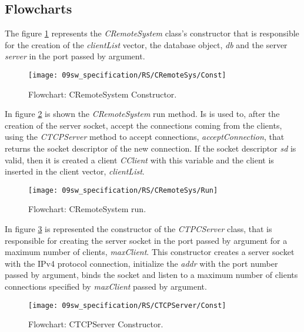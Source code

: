 \clearpage
\subsection{Flowcharts}

The figure \ref{fig:rsConst} represents the \textit{CRemoteSystem} class's constructor that is responsible for the creation of the \textit{clientList} vector, the database object, \textit{db} and the server \textit{server} in the port passed by argument.

\begin{figure}[H]
	\centering
	\texttt{[image: 09sw\_specification/RS/CRemoteSys/Const]}
	\caption{Flowchart: CRemoteSystem Constructor.}
	\label{fig:rsConst}
\end{figure}

In figure \ref{fig:rsRun} is shown the \textit{CRemoteSystem} run method. Is is used to, after the creation of the server socket, accept the connections coming from the clients, using the \textit{CTCPServer} method to accept connections, \textit{acceptConnection}, that returns the socket descriptor of the new connection. If the socket descriptor \textit{sd} is valid, then it is created a client \textit{CClient} with this variable and the client is inserted in the client vector, \textit{clientList}.

\begin{figure}[H]
	\centering
	\texttt{[image: 09sw\_specification/RS/CRemoteSys/Run]}
	\caption{Flowchart: CRemoteSystem run.}
	\label{fig:rsRun}
\end{figure}


In figure \ref{fig:ServerConst} is represented the constructor of the \textit{CTPCServer} class, that is responsible for creating the server socket in the port passed by argument for a maximum number of clients, \textit{maxClient}. This constructor creates a server socket with the IPv4 protocol connection, initialize the \textit{addr} with the port number passed by argument, binds the socket and listen to a maximum number of clients connections specified by \textit{maxClient} passed by argument.

\begin{figure}[H]
	\centering
	\texttt{[image: 09sw\_specification/RS/CTCPServer/Const]}
	\caption{Flowchart: CTCPServer Constructor.}
	\label{fig:ServerConst}
\end{figure}

